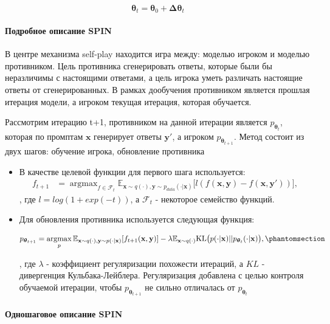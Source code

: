 \documentclass[12pt, twoside]{article}
\newcommand{\bx}{\mathbf{x}}
\newcommand{\by}{\mathbf{y}}
\newcommand{\btheta}{\boldsymbol{\theta}}
\newcommand{\bDelta}{\boldsymbol{\Delta}}
\newcommand{\cF}{\mathcal{F}}
\newcommand{\EE}{\mathbb{E}}
\newcommand{\argmax}{\mathop{\mathrm{argmax}}}
\begin{document}
$$\btheta_t = \btheta_0 + \bDelta\btheta_t$$

\paragraph{Подробное описание SPIN}

В центре механизма self-play находится игра между: моделью игроком и моделью противником. Цель противника сгенерировать ответы, которые были бы неразличимы с настоящими ответами, а цель игрока уметь различать настоящие ответы от сгенерированных. В рамках дообучения противником является прошлая итерация модели, а игроком текущая итерация, которая обучается.

Рассмотрим итерацию t+1, противником на данной итерации является $p_{\btheta_t}$, которая по промптам $\bx$ генерирует ответы $\by'$, а игроком $p_{\btheta_{t+1}}$. Метод состоит из двух шагов: обучение игрока, обновление противника

\begin{itemize}
    \item В качестве целевой функции для первого шага используется:
    \begin{align}
        f_{t+1} &= \argmax_{f \in \cF_{t}}\EE_{\bx\sim q(\cdot), \by\sim p_{data}(\cdot | \bx)}\big[l(f(\bx, \by) - f(\bx, \by')) \big], \label{eq:f*1}
    \end{align}
    , где $l = log(1 + exp(-t))$, а $\cF_t$ - некоторое семейство функций.

    \vspace{8}

    \item Для обновления противника используется следующая функция:
    
    \begin{align} 
        p_{\btheta_{t+1}} = \argmax_ {p}\EE_{\bx \sim q(\cdot), \by\sim p(\cdot|\bx)} [f_{t+1}(\bx, \by)] - \lambda \EE_{\bx\sim q(\cdot)}\mathrm{KL}\big(p(\cdot|\bx)||p_{\btheta_t}(\cdot|\bx)\big), \phantomsection\label{eq:update}
    \end{align} 
    
    , где $\lambda$ - коэффициент регуляризации похожести итераций, а $KL$ - дивергенция Кульбака-Лейблера. Регуляризация добавлена с целью контроля обучаемой итерации, чтобы $p_\btheta_{t+1}$  не сильно отличалась от $p_\btheta_t$
    
    
\end{itemize}

\paragraph{Одношаговое описание SPIN}
\end{document}
